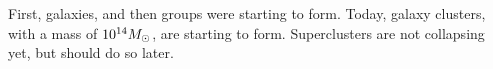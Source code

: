 First, galaxies, and then groups were starting to form.
Today, galaxy clusters, with a mass of $\num{e14} M_\odot$, are starting to form.
Superclusters are not collapsing yet, but should do so later.



















